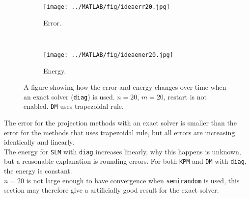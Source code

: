 \begin{figure}[H]
        \centering
        \begin{subfigure}[b]{0.45\textwidth}
                \texttt{[image: ../MATLAB/fig/ideaerr20.jpg]}
                \caption{ Error. }
                \label{fig:ideaerr20}
        \end{subfigure}%
        ~
        \begin{subfigure}[b]{0.45\textwidth}
                \texttt{[image: ../MATLAB/fig/ideaener20.jpg]}
                \caption{ Energy. }
                \label{fig:ideaener20}
        \end{subfigure}
        \caption{ A figure showing how the error and energy changes over time when an exact solver (\texttt{diag}) is used. $n = 20$, $m = 20$, restart is not enabled. \texttt{DM} uses trapezoidal rule.  }
        \label{fig:idea0}
\end{figure}
\noindent The error for the projection methods with an exact solver is smaller than the error for the methods that uses trapezoidal rule, but all errors are increasing identically and linearly. \\
The energy for \texttt{SLM} with \texttt{diag} increases linearly, why this happens is unknown, but a reasonable explanation is rounding errors. For both \texttt{KPM} and \texttt{DM} with \texttt{diag}, the energy is constant.\\

\noindent $n = 20$ is not large enough to have convergence when \texttt{semirandom} is used, this section may therefore give a artificially good result for the exact solver.

